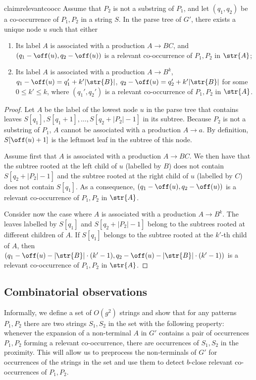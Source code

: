\begin{restatable}{claim}{relevantcoocc}
\label{claim:relevant_cons_occ}
Assume that $P_2$ is not a substring of $P_1$, and let $(q_1,q_2)$ be a co-occurrence of $P_1, P_2$ in a string $S$. In the parse tree of $G'$, there exists a unique node $u$ such that either
\begin{enumerate}
\item Its label $A$ is associated with a production $A \rightarrow BC$, and $(q_1-\off(u),q_2-\off(u))$ is a relevant co-occurrence of $P_1,P_2$ in $\str{A}$;
\item Its label $A$ is associated with a production $A \rightarrow B^k$, $q_1-\off(u)=q_1'+k' |\str{B}|$, $q_2-\off(u)=q_2'+k' |\str{B}|$ for some $0 \le k' \le k$, where $(q_1',q_2')$ is a relevant co-occurrence of $P_1, P_2$ in $\str{A}$. 
\end{enumerate}
\end{restatable}
\begin{proof}
Let $A$ be the label of the lowest node $u$ in the parse tree that contains leaves $S[q_1], S[q_1+1], \ldots, S[q_2+|P_2|-1]$ in its subtree. Because $P_2$ is not a substring of $P_1$, $A$ cannot be associated with a production $A \rightarrow a$. By definition, $S[\off(u)+1]$ is the leftmost leaf in the subtree of this node. 

Assume first that $A$ is associated with a production $A \rightarrow BC$. We then have that the subtree rooted at the left child of $u$ (labelled by $B$) does not contain $S[q_2+|P_2|-1]$ and the subtree rooted at the right child of $u$ (labelled by $C$) does not contain $S[q_1]$. As a consequence, $(q_1-\off(u),q_2-\off(u))$ is a relevant co-occurrence of $P_1,P_2$ in $\str{A}$. 

Consider now the case where $A$ is associated with a production $A \rightarrow B^k$. The leaves labelled by $S[q_1]$ and $S[q_2+|P_2|-1]$ belong to the subtrees rooted at different children of $A$. If $S[q_1]$ belongs to the subtree rooted at the $k'$-th child of $A$, then $(q_1-\off(u)-|\str{B}| \cdot (k'-1),q_2-\off(u)-|\str{B}| \cdot (k'-1))$ is a relevant co-occurrence of $P_1,P_2$ in $\str{A}$. 
\end{proof}

\subsection{Combinatorial observations}
Informally, we define a set of $O(g^2)$ strings and show that for any patterns $P_1,P_2$ there are two strings $S_1,S_2$ in the set with the following property: whenever the expansion of a non-terminal $A$ in $G'$ contains a pair of occurrences $P_1,P_2$ forming a relevant co-occurrence, there are occurrences of $S_1,S_2$ in the proximity. This will allow us to preprocess the non-terminals of $G'$ for occurrences of the strings in the set and use them to detect $b$-close relevant co-occurrences of $P_1,P_2$. 

